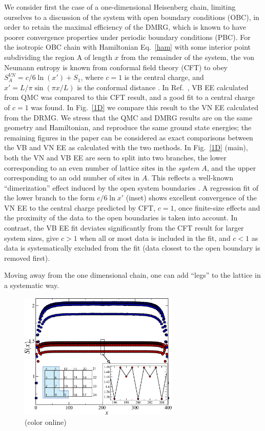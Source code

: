 \documentclass[prl,aps,twocolumn,floatfix,amsmath,amssymb,superscriptaddress,tightenlines]{revtex4}
\begin{document}
We consider first the case of a one-dimensional Heisenberg chain, limiting ourselves to a discussion of the system with open boundary conditions (OBC), in order to retain the maximal efficiency of the DMRG, which is known to have poorer convergence properties under periodic boundary conditions (PBC).  For the isotropic OBC chain with Hamiltonian Eq.~\eqref{ham} with some interior point subdividing the region A of length $x$ from the remainder of the system, the von Neumann entropy is known from conformal field theory (CFT) to obey $S^{VN}_A = c/6 \ln(x') + S_1$, where $c=1$ is the central charge, and $x'=L/\pi \sin(\pi x / L)$ is the conformal distance \cite{Cardy}.
In Ref.~\cite{Alet}, VB EE calculated from QMC was compared to this CFT result, and a good fit to a central charge of $c=1$ was found.  In Fig.~\ref{1D} we compare this result to the VN EE calculated from the DRMG.  We stress that the QMC and DMRG results are on the same geometry and Hamiltonian, and reproduce the same ground state energies; the remaining figures in the paper can be considered as exact comparisons between the VB and VN EE as calculated with the two methods.  In Fig.~\ref{1D} (main), both the VN and VB EE are seen to split into two branches, the lower corresponding to an even number of lattice sites in the {\it system} $A$, and the upper corresponding to an odd number of sites in $A$.  This reflects a well-known ``dimerization'' effect induced by the open system boundaries \cite{Ian1}.  A regression fit of the lower branch to the form $c/6 \ln {x'}$ (inset) shows excellent convergence of the VN EE to the central charge predicted by CFT, $c=1$, once finite-size effects and the proximity of the data to the open boundaries is taken into account.  In contrast, the VB EE fit deviates significantly from the CFT result for larger system sizes, give $c>1$ when all or most data is included in the fit, and $c<1$ as data is systematically excluded from the fit (data closest to the open boundary is removed first).  

Moving away from the one dimensional chain, one can add ``legs'' to the lattice in a systematic way.
\begin{figure}
{
\includegraphics[width=3in]{FIG2.eps}
\caption{(color online) 
\label{ladder}}}
\end{figure}
\end{document}
